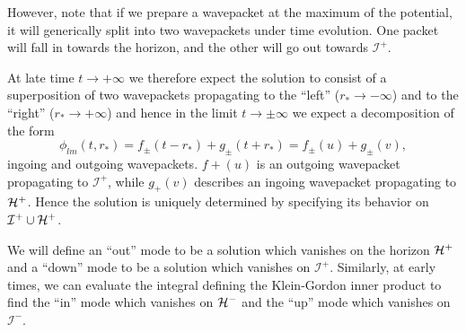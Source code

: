 However, note that if we prepare a wavepacket at the maximum of the potential, it will generically split into two wavepackets under time evolution. One packet will fall in towards the horizon, and the other will go out towards $\mathcal{I}^+$.

At late time $t\to +\infty$ we therefore expect the solution to consist of a superposition of two wavepackets propagating to the ``left'' ($r_*\to -\infty$) and to the ``right'' ($r_*\to +\infty$) and hence in the limit $t\to \pm \infty$ we expect a decomposition of the form
\begin{equation}
     \phi_{lm}(t,r_*) = f_\pm (t-r_*) + g_\pm (t+ r_*) = f_\pm (u) + g_\pm(v),
\end{equation}
ingoing and outgoing wavepackets. $f+(u)$ is an outgoing wavepacket propagating to $\mathcal{I}^+$, while $g_+(v)$ describes an ingoing wavepacket propagating to $\mathcal H^+$.
Hence the solution is uniquely determined by specifying its behavior on $\mathcal{I}^+ \cup \mathcal H^+$.

We will define an ``out'' mode to be a solution which vanishes on the horizon $\mathcal H^+$ and a ``down'' mode to be a solution which vanishes on $\mathcal{I}^+$.
Similarly, at early times, we can evaluate the integral defining the Klein-Gordon inner product to find the ``in'' mode which vanishes on $\mathcal H^-$ and the ``up'' mode which vanishes on $\mathcal{I}^-$.